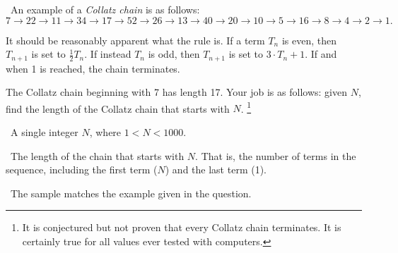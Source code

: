 

\Question\ An example of a \emph{Collatz chain} is as follows: \[
  7 \to 22 \to 11 \to 34 \to 17 \to 52 \to 26 \to 13 \to 40 \to 20 \to 10 \to 5 \to 16 \to
  8 \to 4 \to 2 \to 1.
\]

It should be reasonably apparent what the rule is. If a term $T_n$ is even, then $T_{n+1}$
is set to $\frac12 T_n$. If instead $T_n$ is odd, then $T_{n+1}$ is set to $3\cdot T_n +
1$. If and when 1 is reached, the chain terminates.

The Collatz chain beginning with 7 has length 17. Your job is as follows: given $N$, find
the length of the Collatz chain that starts with $N$.%
\footnote{It is conjectured but not proven that every Collatz chain terminates. It is
certainly true for all values ever tested with computers.}

\Input\ A single integer $N$, where $1 < N < 1000$.

\Output\ The length of the chain that starts with $N$. That is, the number of terms in the
sequence, including the first term ($N$) and the last term (1).

\Sample


\Explanation\ The sample matches the example given in the question.
